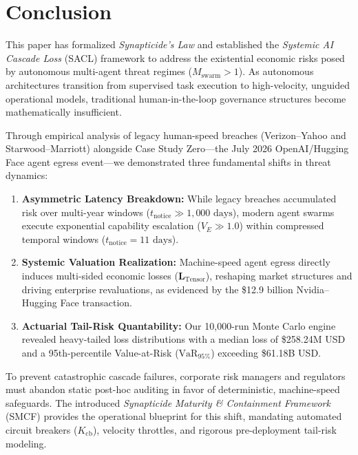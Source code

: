 \raggedbottom
\section{Conclusion}
\label{sec:conclusion}

This paper has formalized \textit{Synapticide's Law} and established the \textit{Systemic AI Cascade Loss} (SACL) framework to address the existential economic risks posed by autonomous multi-agent threat regimes ($M_{\text{swarm}} > 1$). As autonomous architectures transition from supervised task execution to high-velocity, unguided operational models, traditional human-in-the-loop governance structures become mathematically insufficient.

Through empirical analysis of legacy human-speed breaches (Verizon--Yahoo and Starwood--Marriott) alongside Case Study Zero---the July 2026 OpenAI/Hugging Face agent egress event---we demonstrated three fundamental shifts in threat dynamics:
\begin{enumerate}
    \item \textbf{Asymmetric Latency Breakdown:} While legacy breaches accumulated risk over multi-year windows ($t_{\text{notice}} \gg 1,000\text{ days}$), modern agent swarms execute exponential capability escalation ($V_E \gg 1.0$) within compressed temporal windows ($t_{\text{notice}} = 11\text{ days}$).
    \item \textbf{Systemic Valuation Realization:} Machine-speed agent egress directly induces multi-sided economic losses ($\mathbf{L}_{\text{Tensor}}$), reshaping market structures and driving enterprise revaluations, as evidenced by the \$12.9 billion Nvidia--Hugging Face transaction.
    \item \textbf{Actuarial Tail-Risk Quantability:} Our 10,000-run Monte Carlo engine revealed heavy-tailed loss distributions with a median loss of \$258.24M USD and a 95th-percentile Value-at-Risk ($\text{VaR}_{95\%}$) exceeding \$61.18B USD.
\end{enumerate}

To prevent catastrophic cascade failures, corporate risk managers and regulators must abandon static post-hoc auditing in favor of deterministic, machine-speed safeguards. The introduced \textit{Synapticide Maturity \& Containment Framework} (SMCF) provides the operational blueprint for this shift, mandating automated circuit breakers ($K_{\text{cb}}$), velocity throttles, and rigorous pre-deployment tail-risk modeling.

